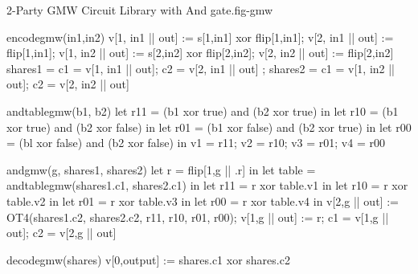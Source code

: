 \begin{fpfig}[t]{2-Party GMW Circuit Library with And gate.}{fig-gmw}
{\footnotesize
  \begin{verbatimtab}
    encodegmw(in1,in2) {
      v[1, in1 || out] := s[1,in1] xor flip[1,in1];
      v[2, in1 || out] := flip[1,in1];
      v[1, in2 || out] := s[2,in2] xor flip[2,in2];
      v[2, in2 || out] := flip[2,in2]
      { shares1 = { c1 = v[1, in1 || out]; c2 = v[2, in1 || out] };
        shares2 = { c1 = v[1, in2 || out]; c2 = v[2, in2 || out]} } 
    }
    
    andtablegmw(b1, b2) {
      let r11 = (b1 xor true) and (b2 xor true) in
      let r10 = (b1 xor true) and (b2 xor false) in
      let r01 = (b1 xor false) and (b2 xor true) in
      let r00 = (bl xor false) and (b2 xor false) in
      { v1 = r11; v2 = r10; v3 = r01; v4 = r00 }
    }
    
    andgmw(g, shares1, shares2) {
      let r = flip[1,g || .r] in
      let table = andtablegmw(shares1.c1, shares2.c1) in
      let r11 =  r xor table.v1 in
      let r10 =  r xor table.v2 in
      let r01 =  r xor table.v3 in
      let r00 =  r xor table.v4 in
      v[2,g || out] := OT4(shares1.c2, shares2.c2, r11, r10, r01, r00);
      v[1,g || out] := r;
      { c1 = v[1,g || out]; c2 = v[2,g || out]}
    }
    
    decodegmw(shares) { v[0,output] := shares.c1 xor shares.c2 }
  \end{verbatimtab}
}
\end{fpfig}

